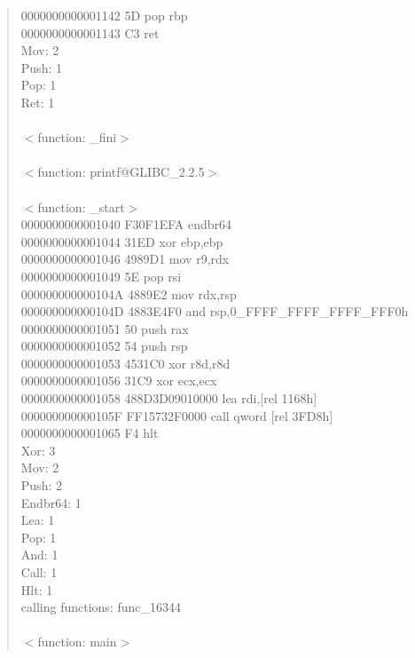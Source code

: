 \documentclass[12pt,a4paper,dvipdfmx]{jsarticle}
\begin{document}
\begin{quote}
0000000000001142 5D                   pop       rbp \\
0000000000001143 C3                   ret \\
Mov: 2 \\
Push: 1 \\
Pop: 1 \\
Ret: 1 \\
 \\
$<$function: \_fini$>$ \\
 \\
$<$function: printf@GLIBC\_2.2.5$>$ \\
 \\
$<$function: \_start$>$ \\
0000000000001040 F30F1EFA             endbr64 \\
0000000000001044 31ED                 xor       ebp,ebp \\
0000000000001046 4989D1               mov       r9,rdx \\
0000000000001049 5E                   pop       rsi \\
000000000000104A 4889E2               mov       rdx,rsp \\
000000000000104D 4883E4F0             and       rsp,0\_FFFF\_FFFF\_FFFF\_FFF0h \\
0000000000001051 50                   push      rax \\
0000000000001052 54                   push      rsp \\
0000000000001053 4531C0               xor       r8d,r8d \\
0000000000001056 31C9                 xor       ecx,ecx \\
0000000000001058 488D3D09010000       lea       rdi,[rel 1168h] \\
000000000000105F FF15732F0000         call      qword [rel 3FD8h] \\
0000000000001065 F4                   hlt \\
Xor: 3 \\
Mov: 2 \\
Push: 2 \\
Endbr64: 1 \\
Lea: 1 \\
Pop: 1 \\
And: 1 \\
Call: 1 \\
Hlt: 1 \\
calling functions: func\_16344 \\
 \\
$<$function: main$>$ \\

\end{quote}
\end{document}
